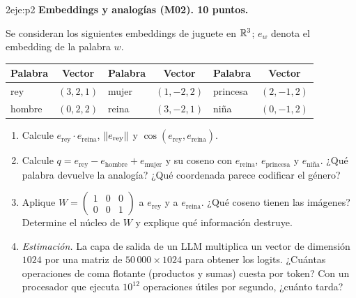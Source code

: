 \begin{ejercicio}{2}{eje:p2}
\textbf{Embeddings y analogías (M02). 10 puntos.}

Se consideran los siguientes embeddings de juguete en $\mathbb{R}^{3}$; $e_w$ denota el embedding de la palabra $w$.
\begin{center}
\begin{tabular}{@{}lc@{\qquad}lc@{\qquad}lc@{}}
\toprule
Palabra & Vector & Palabra & Vector & Palabra & Vector \\
\midrule
rey & $(3,2,1)$ & mujer & $(1,-2,2)$ & princesa & $(2,-1,2)$ \\
hombre & $(0,2,2)$ & reina & $(3,-2,1)$ & niña & $(0,-1,2)$ \\
\bottomrule
\end{tabular}
\end{center}
\begin{enumerate}[label=(\alph*)]
  \item {} Calcule $e_{\text{rey}}\cdot e_{\text{reina}}$, $\lVert e_{\text{rey}}\rVert$ y $\cos(e_{\text{rey}},e_{\text{reina}})$.
  \item {} Calcule $q=e_{\text{rey}}-e_{\text{hombre}}+e_{\text{mujer}}$ y su coseno con $e_{\text{reina}}$, $e_{\text{princesa}}$ y $e_{\text{niña}}$. ¿Qué palabra devuelve la analogía? ¿Qué coordenada parece codificar el género?
  \item {} Aplique $W=\begin{pmatrix}1&0&0\\0&0&1\end{pmatrix}$ a $e_{\text{rey}}$ y a $e_{\text{reina}}$. ¿Qué coseno tienen las imágenes? Determine el núcleo de $W$ y explique qué información destruye.
  \item {} \emph{Estimación.} La capa de salida de un LLM multiplica un vector de dimensión $1024$ por una matriz de $50\,000\times 1024$ para obtener los logits. ¿Cuántas operaciones de coma flotante (productos y sumas) cuesta por token? Con un procesador que ejecuta $10^{12}$ operaciones útiles por segundo, ¿cuánto tarda?
\end{enumerate}
\end{ejercicio}

